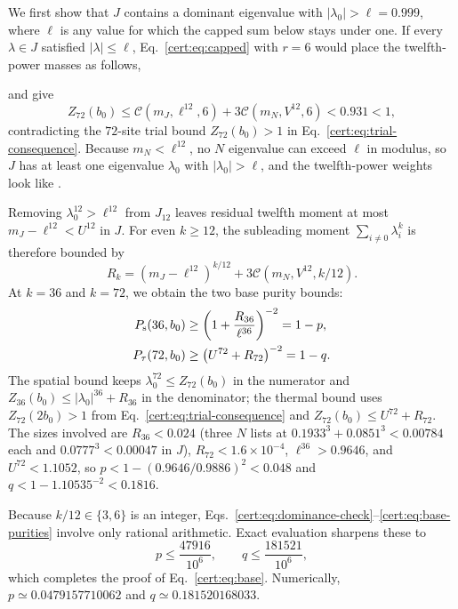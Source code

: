 We first show that $J$ contains a dominant eigenvalue with
$|\lambda_0|>\ell=0.999$, where $\ell$ is any value for which the capped
sum below stays under one. If every $\lambda\in J$ satisfied
$|\lambda|\le\ell$, Eq.~\eqref{cert:eq:capped} with $r=6$ would place
the twelfth-power masses as follows,
\begin{proofdiagram}
 \cappedmassfigure
\end{proofdiagram}
and give
\begin{equation}
 Z_{72}(b_0)
 \le\mathcal C(m_J,\ell^{12},6)
      +3\mathcal C(m_N,V^{12},6)
 <0.931<1,
 \label{cert:eq:dominance-check}
\end{equation}
contradicting the $72$-site trial bound $Z_{72}(b_0)>1$ in
Eq.~\eqref{cert:eq:trial-consequence}. Because $m_N<\ell^{12}$, no $N$
eigenvalue can exceed $\ell$ in modulus, so $J$ has at least one
eigenvalue $\lambda_0$ with $|\lambda_0|>\ell$, and the twelfth-power
weights look like \sectorspectrum.

Removing $\lambda_0^{12}>\ell^{12}$ from $J_{12}$ leaves residual twelfth
moment at most $m_J-\ell^{12}<U^{12}$ in $J$. For even $k\ge12$, the
subleading moment $\sum_{i\ne0}\lambda_i^k$ is therefore bounded by
\begin{equation}
 R_k=(m_J-\ell^{12})^{k/12}
       +3\mathcal C(m_N,V^{12},k/12).
 \label{cert:eq:base-residual}
\end{equation}
At $k=36$ and $k=72$, we obtain the two base purity bounds:
\begin{align}
 P_{\mathrm s}(36,b_0)&\ge
   \left(1+\frac{R_{36}}{\ell^{36}}\right)^{-2}=1-p,\notag \\
 P_{\tau}(72,b_0)&\ge
   \left(U^{72}+R_{72}\right)^{-2}=1-q.
 \label{cert:eq:base-purities}
\end{align}
The spatial bound keeps $\lambda_0^{72}\le Z_{72}(b_0)$ in the numerator
and $Z_{36}(b_0)\le|\lambda_0|^{36}+R_{36}$ in the denominator; the
thermal bound uses $Z_{72}(2b_0)>1$ from
Eq.~\eqref{cert:eq:trial-consequence} and
$Z_{72}(b_0)\le U^{72}+R_{72}$. The sizes involved are
$R_{36}<0.024$ (three $N$ lists at $0.1933^3+0.0851^3<0.00784$ each and
$0.0777^3<0.00047$ in $J$), $R_{72}<1.6\times10^{-4}$,
$\ell^{36}>0.9646$, and $U^{72}<1.1052$, so
$p<1-(0.9646/0.9886)^2<0.048$ and $q<1-1.10535^{-2}<0.1816$.

Because $k/12\in\{3,6\}$ is an integer, Eqs.~\eqref{cert:eq:dominance-check}--\eqref{cert:eq:base-purities}
involve only rational arithmetic. Exact evaluation sharpens these to
\begin{equation}
 p\le\frac{47916}{10^6},\qquad
 q\le\frac{181521}{10^6},
 \label{cert:eq:scalar-checks}
\end{equation}
which completes the proof of Eq.~\eqref{cert:eq:base}. Numerically,
$p\simeq0.0479157710062$ and $q\simeq0.181520168033$.

